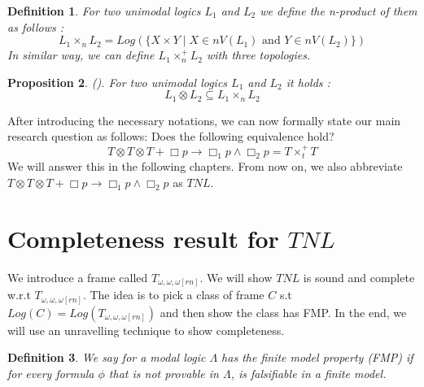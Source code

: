 \documentclass[12pt, a4paper]{scrartcl}
\newtheorem{definition}{Definition}[subsection]
\newtheorem{proposition}[definition]{Proposition}
\begin{document}
\begin{definition}
    For two unimodal logics $L_1$ and $L_2$ we define the n-product of them as follows :
    $$ L_1 \times_n L_2 = Log(\{ X \times Y \mid X \in nV(L_1) \mbox{ and } Y \in nV(L_2) \})$$   
    In similar way, we can define $L_1 \times^+_n L_2$ with three topologies.     
\end{definition}

\begin{proposition}(\cite{?}).
    For two unimodal logics $L_1$ and $L_2$ it holds : 
    $$L_1 \otimes L_2 \subseteq L_1 \times_n L_2$$
\end{proposition}


After introducing the necessary notations, we can now formally state our main research question as follows:
Does the following equivalence hold?
$$T \otimes T \otimes T + \Box p \rightarrow \Box_1 p \land \Box_2 p = T \times^+_t T$$
We will answer this in the following chapters.
From now on, we also abbreviate $T \otimes T \otimes T + \Box p \rightarrow \Box_1 p \land \Box_2 p$ as $\mathit{TNL}$. 
\clearpage

\section{Completeness result for $\mathit{TNL}$}

We introduce a frame called $T_{\omega, \omega, \omega[rn]}$. We will show $\mathit{TNL}$ is sound and complete w.r.t $T_{\omega, \omega, \omega[rn]}$.
The idea is to pick a class of frame $C$ s.t $Log(C) = Log(T_{\omega, \omega, \omega[rn]})$ and then show the class has FMP.
In the end, we will use an unravelling technique to show completeness. 

\begin{definition}
    We say for a modal logic $\Lambda$ has the finite model property (FMP) if for every formula $\phi$ that is not provable in $\Lambda$,
    is falsifiable in a finite model.
        
\end{definition}
\end{document}
